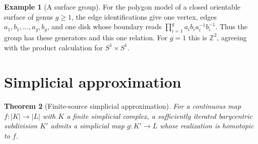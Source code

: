 \documentclass[11pt,oneside,openany]{book}
\theoremstyle{plain}
\newtheorem{theorem}{Theorem}[chapter]
\theoremstyle{definition}
\newtheorem{example}[theorem]{Example}
\theoremstyle{remark}
\begin{document}
\begin{example}[A surface group]
For the polygon model of a closed orientable surface of
genus \(g\ge1\), the edge identifications give one vertex,
edges \(a_1,b_1,\ldots,a_g,b_g\), and one disk whose
boundary reads \(\prod_{i=1}^g a_i b_i a_i^{-1}b_i^{-1}\).
Thus the group has these generators and this one relation.
For \(g=1\) this is \(\mathbb Z^2\), agreeing with the
product calculation for \(S^1\times S^1\).
\end{example}

\section{Simplicial approximation}\label{p202:T11}

\begin{theorem}[Finite-source simplicial approximation]
\label{thm:p202-simplicial-approx}
For a continuous map \(f:|K|\to |L|\) with \(K\) a finite
simplicial complex, a sufficiently iterated barycentric
subdivision \(K'\) admits a simplicial map \(g:K'\to L\)
whose realization is homotopic to \(f\).
\end{theorem}
\end{document}
